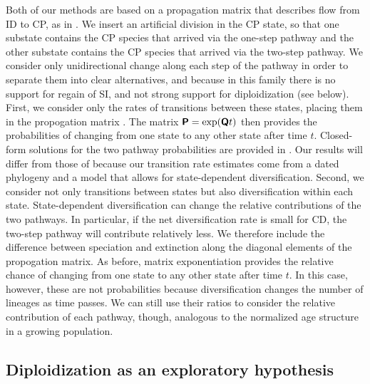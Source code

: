 Both of our methods are based on a propagation matrix that describes flow from ID to CP, as in \citet{robertson_2011}.
We insert an artificial division in the CP state, so that one substate contains the CP species that arrived via the one-step pathway and the other substate contains the CP species that arrived via the two-step pathway.
We consider only unidirectional change along each step of the pathway in order to separate them into clear alternatives, and because in this family there is no support for regain of SI, and not strong support for diploidization (see below).
First, we consider only the rates of transitions between these states, placing them in the propogation matrix .
The matrix $\bm{\mathsf{P}} = \exp(\bm{\mathsf{Q}} t)$ then provides the probabilities of changing from one state to any other state after time $t$.
Closed-form solutions for the two pathway probabilities are provided in \citet{robertson_2011}.
Our results will differ from those of \citet{robertson_2011} because our transition rate estimates come from a dated phylogeny and a model that allows for state-dependent diversification.
%
Second, we consider not only transitions between states but also diversification within each state.
State-dependent diversification can change the relative contributions of the two pathways.
In particular, if the net diversification rate is small for CD, the two-step pathway will contribute relatively less.
We therefore include the difference between speciation and extinction along the diagonal elements of the propogation matrix.
As before, matrix exponentiation provides the relative chance of changing from one state to any other state after time $t$.
In this case, however, these are not probabilities because diversification changes the number of lineages as time passes.
We can still use their ratios to consider the relative contribution of each pathway, though, analogous to the normalized age structure in a growing population. %


\subsection{Diploidization as an exploratory hypothesis}

